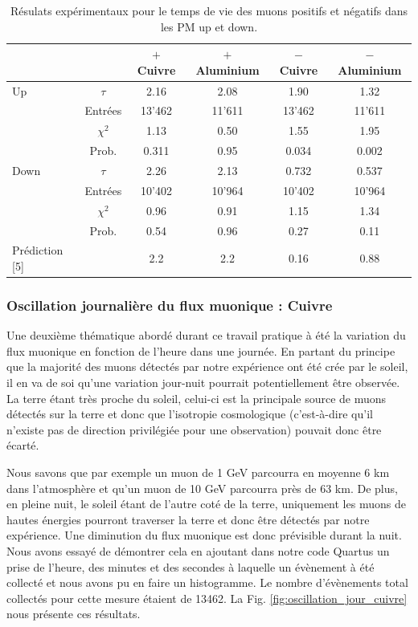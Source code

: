 \documentclass[12pt]{article}
\begin{document}
\begin{table}[htbp!]
  \centering
  \captionsetup{width=0.9\textwidth}
  \caption{Résulats expérimentaux pour le temps de vie des muons positifs et négatifs dans les PM up et down.}
  \begin{tabular}{lc|cccc}
     & & $+$ Cuivre  & $+$ Aluminium & $-$ Cuivre & $-$ Aluminium \\
    \hline
    Up &  $\tau$ & 2.16 & 2.08 & 1.90 & 1.32\\
    &Entrées & 13'462 & 11'611 & 13'462 & 11'611 \\
    & $\chi^{2}$ & 1.13 & 0.50 & 1.55 & 1.95\\
    & Prob. & 0.311 & 0.95 & 0.034 & 0.002\\
    \hline
    Down & $\tau$ & 2.26 & 2.13 & 0.732 & 0.537 \\
    &Entrées & 10'402 & 10'964  & 10'402 & 10'964\\
    &$\chi^{2}$ & 0.96 & 0.91 & 1.15 & 1.34 \\
    &Prob. & 0.54 & 0.96 & 0.27 & 0.11\\
    \hline
    Prédiction [5] & & 2.2 & 2.2 & 0.16 & 0.88 \\
    
\end{tabular}
\label{TauPositifNegatifComplet}
\end{table}

\newpage
\subsubsection{Oscillation journalière du flux muonique : Cuivre}

Une deuxième thématique abordé durant ce travail pratique à été la variation du flux muonique en fonction de l'heure dans une journée. En partant du principe que la majorité des muons détectés par notre expérience ont été crée par le soleil, il en va de soi qu'une variation jour-nuit pourrait potentiellement être observée. La terre étant très proche du soleil, celui-ci est la principale source de muons détectés sur la terre et donc que l'isotropie cosmologique (c'est-à-dire qu'il n'existe pas de direction privilégiée pour une observation) pouvait donc être écarté.

Nous savons que par exemple un muon de 1 GeV parcourra en moyenne 6 km dans l'atmosphère et qu'un muon de 10 GeV parcourra près de 63 km. De plus, en pleine nuit, le soleil étant de l'autre coté de la terre, uniquement les muons de hautes énergies pourront traverser la terre et donc être détectés par notre expérience. Une diminution du flux muonique est donc prévisible durant la nuit. Nous avons essayé de démontrer cela en ajoutant dans notre code Quartus un prise de l'heure, des minutes et  des secondes à laquelle un évènement à été collecté et nous avons pu en faire un histogramme. Le nombre d'évènements total collectés pour cette mesure étaient de 13462. La Fig. \ref{fig:oscillation_jour_cuivre} nous présente ces résultats.
\end{document}
